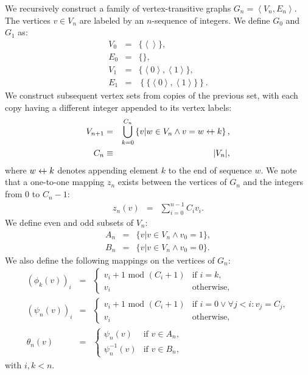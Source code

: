 \documentclass[twocolumn]{article}
\newcommand{\la}{\left\langle}
\newcommand{\ra}{\right\rangle}
\newcommand{\beq}{\begin{eqnarray}}
\newcommand{\eeq}{\end{eqnarray}}
\newcommand{\append}{\leftarrow{\mkern-18mu}{+}\:}
\begin{document}
We recursively construct a family of vertex-transitive graphs
$G_n = \la V_n, E_n \ra$.
The vertices $v \in V_n$ are labeled by an $n$-sequence of integers.
We define $G_0$ and $G_1$ as:
\beq
V_0 &=& \{ \la\ra \}, \\
E_0 &=& \{ \}, \\
V_1 &=& \{\la{0}\ra,\la{1}\ra\}, \\
E_1 &=& \left\{\{\la{0}\ra,\la{1}\ra\}\right\}.
\eeq
We construct subsequent vertex sets from copies of the previous set,
with each copy having a different integer appended to its vertex labels:
\beq
\label{eq:vn}
V_{n+1} &=& \bigcup_{k = 0}^{C_n}
\left\{ v | w \in V_n \land v = w \append k \right\},
\\
C_n &\equiv& |V_n|,
\eeq
where $w \append k$ denotes appending element $k$ to the end of sequence $w$.
We note that a one-to-one mapping $z_n$ exists between the vertices of $G_n$ and the
integers from $0$ to $C_n - 1$:
\beq
z_n(v) &=& \sum_{i=0}^{n-1} C_i v_i.
\eeq
We define even and odd subsets of $V_n$:
\beq
A_n &=& \{ v | v \in V_n \land v_0 = 1 \}, \\
B_n &=& \{ v | v \in V_n \land v_0 = 0 \}.
\eeq
We also define the following mappings on the vertices of $G_n$:
\beq
(\phi_k(v))_i
&=&
\begin{cases}
v_i + 1 \mbox{ mod } (C_i + 1) & \mbox{if } i = k,
\\
v_i & \mbox{otherwise},
\end{cases}
\\
(\psi_n(v))_i
&=&
\begin{cases}
v_i + 1 \mbox{ mod } (C_i + 1)
& \mbox{if } i = 0 \lor \forall j < i: v_j = C_j, \\
v_i & \mbox{otherwise},
\end{cases}
\\
\theta_n(v)
&=&
\begin{cases}
\psi_n(v) & \mbox{if } v \in A_n, \\
\psi_n^{-1}(v) & \mbox{if } v \in B_n,
\end{cases}
\eeq
with $i, k < n$.
\end{document}
